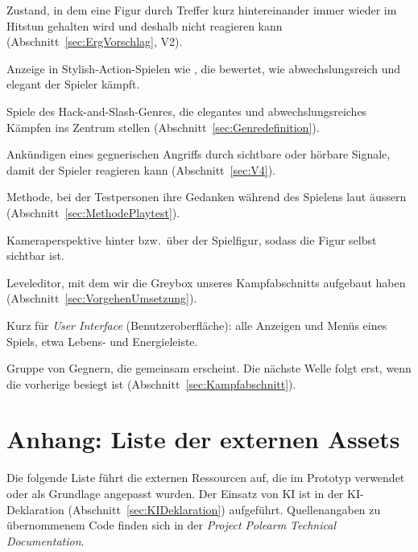 \documentclass[../Main.tex]{subfiles}
\begin{document}
\begin{description}[style=unboxed, leftmargin=0cm, itemsep=0.3em]
\item[Stunlock] Zustand, in dem eine Figur durch Treffer kurz hintereinander immer wieder im Hitstun gehalten wird und deshalb nicht reagieren kann (Abschnitt~\ref{sec:ErgVorschlag}, V2).
\item[Stylemeter] Anzeige in Stylish-Action-Spielen wie , die bewertet, wie abwechslungsreich und elegant der Spieler kämpft.
\item[Stylish-Action] Spiele des Hack-and-Slash-Genres, die elegantes und abwechslungsreiches Kämpfen ins Zentrum stellen (Abschnitt~\ref{sec:Genredefinition}).
\item[Telegrafieren] Ankündigen eines gegnerischen Angriffs durch sichtbare oder hörbare Signale, damit der Spieler reagieren kann (Abschnitt~\ref{sec:V4}).
\item[Think-aloud] Methode, bei der Testpersonen ihre Gedanken während des Spielens laut äussern (Abschnitt~\ref{sec:MethodePlaytest}).
\item[Third-Person-Perspektive] Kameraperspektive hinter bzw.\ über der Spielfigur, sodass die Figur selbst sichtbar ist.
\item[TrenchBroom] Leveleditor, mit dem wir die Greybox unseres Kampfabschnitts aufgebaut haben (Abschnitt~\ref{sec:VorgehenUmsetzung}).
\item[UI] Kurz für \textit{User Interface} (Benutzeroberfläche): alle Anzeigen und Menüs eines Spiels, etwa Lebens- und Energieleiste.
\item[Welle] Gruppe von Gegnern, die gemeinsam erscheint. Die nächste Welle folgt erst, wenn die vorherige besiegt ist (Abschnitt~\ref{sec:Kampfabschnitt}).
\end{description}

\newpage
\section{Anhang: Liste der externen Assets} \label{sec:Assets}

Die folgende Liste führt die externen Ressourcen auf, die im Prototyp verwendet oder als Grundlage angepasst wurden. Der Einsatz von KI ist in der KI-Deklaration (Abschnitt~\ref{sec:KIDeklaration}) aufgeführt. Quellenangaben zu übernommenem Code finden sich in der \textit{Project Polearm Technical Documentation}.
\end{document}
